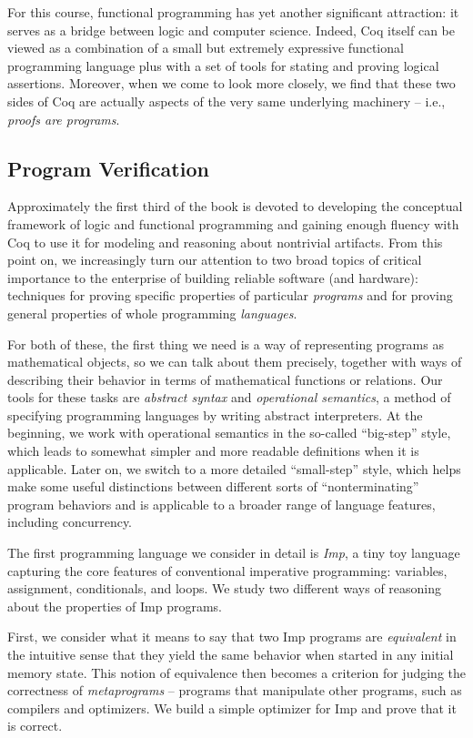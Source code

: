 For this course, functional programming has yet another significant
attraction: it serves as a bridge between logic and computer science.
Indeed, Coq itself can be viewed as a combination of a small but
extremely expressive functional programming language plus with a set of
tools for stating and proving logical assertions. Moreover, when we come
to look more closely, we find that these two sides of Coq are actually
aspects of the very same underlying machinery -- i.e., \emph{proofs are
programs}.

\subsection{Program Verification}\label{program-verification}

Approximately the first third of the book is devoted to developing the
conceptual framework of logic and functional programming and gaining
enough fluency with Coq to use it for modeling and reasoning about
nontrivial artifacts. From this point on, we increasingly turn our
attention to two broad topics of critical importance to the enterprise
of building reliable software (and hardware): techniques for proving
specific properties of particular \emph{programs} and for proving
general properties of whole programming \emph{languages}.

For both of these, the first thing we need is a way of representing
programs as mathematical objects, so we can talk about them precisely,
together with ways of describing their behavior in terms of mathematical
functions or relations. Our tools for these tasks are \emph{abstract
syntax} and \emph{operational semantics}, a method of specifying
programming languages by writing abstract interpreters. At the
beginning, we work with operational semantics in the so-called
``big-step'' style, which leads to somewhat simpler and more readable
definitions when it is applicable. Later on, we switch to a more
detailed ``small-step'' style, which helps make some useful distinctions
between different sorts of ``nonterminating'' program behaviors and is
applicable to a broader range of language features, including
concurrency.

The first programming language we consider in detail is \emph{Imp}, a
tiny toy language capturing the core features of conventional imperative
programming: variables, assignment, conditionals, and loops. We study
two different ways of reasoning about the properties of Imp programs.

First, we consider what it means to say that two Imp programs are
\emph{equivalent} in the intuitive sense that they yield the same
behavior when started in any initial memory state. This notion of
equivalence then becomes a criterion for judging the correctness of
\emph{metaprograms} -- programs that manipulate other programs, such as
compilers and optimizers. We build a simple optimizer for Imp and prove
that it is correct.

